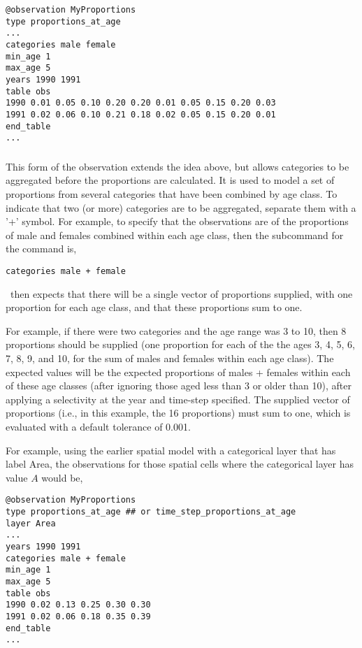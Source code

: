 {\small{\begin{verbatim}
@observation MyProportions
type proportions_at_age
...
categories male female
min_age 1
max_age 5
years 1990 1991
table obs
1990 0.01 0.05 0.10 0.20 0.20 0.01 0.05 0.15 0.20 0.03
1991 0.02 0.06 0.10 0.21 0.18 0.02 0.05 0.15 0.20 0.01
end_table
...
\end{verbatim}

\subsubsection*{}

This form of the observation extends the idea above, but allows categories to be aggregated before the proportions are calculated. It is used to model a set of proportions from several categories that have been combined by age class. To indicate that two (or more) categories are to be aggregated, separate them with a '+' symbol. For example, to specify that the observations are of the proportions of male and females combined within each age class, then the subcommand  for the  command is,

{\small{\begin{verbatim}
categories male + female
\end{verbatim}}}

\CNAME\ then expects that there will be a single vector of proportions supplied, with one proportion for each age class, and that these proportions sum to one. 

For example, if there were two categories and the age range was 3 to 10, then 8 proportions should be supplied (one proportion for each of the the ages 3, 4, 5, 6, 7, 8, 9, and 10, for the sum of males and females within each age class). The expected values will be the expected proportions of males + females within each of these age classes (after ignoring those aged less than 3 or older than 10), after applying a selectivity at the year and time-step specified. The supplied vector of proportions (i.e., in this example, the 16 proportions) must sum to one, which is evaluated with a default tolerance of 0.001. 

For example, using the earlier spatial model with a categorical layer that has label Area, the observations for those spatial cells where the categorical layer has value $A$ would be, 

{\small{\begin{verbatim}
@observation MyProportions
type proportions_at_age ## or time_step_proportions_at_age
layer Area
...
years 1990 1991
categories male + female
min_age 1
max_age 5
table obs
1990 0.02 0.13 0.25 0.30 0.30
1991 0.02 0.06 0.18 0.35 0.39
end_table
...
\end{verbatim}

}}}}
